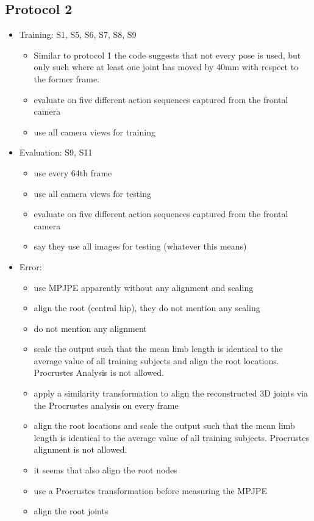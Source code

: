 \subsection{Protocol 2}
	\begin{itemize}
		\item Training: S1, S5, S6, S7, S8, S9
		\begin{itemize}
			\item Similar to protocol 1 the code suggests that not every pose is used, but only such where at least one joint has moved by 40mm with respect to the former frame.
			\item \cite{bogo16} evaluate on five different action sequences captured from the frontal camera
			\item \cite{tekin16, tekin17} use all camera views for training
		\end{itemize}
		\item Evaluation: S9, S11 
		\begin{itemize}
			\item \cite{sun17} use every 64th frame
			\item \cite{tekin16, tekin17} use all camera views for testing
			\item \cite{bogo16} evaluate on five different action sequences captured from the frontal camera
			\item \cite{moreno-noguer16} say they use all images for testing (whatever this means) 
		\end{itemize}
		\item Error: \begin{itemize}
			\item \cite{sun17} use MPJPE apparently without any alignment and scaling
			\item \cite{martinez17} align the root (central hip), they do not mention any scaling
			\item \cite{tome17} do not mention any alignment
			\item \cite{zhou18} scale the output such that the mean limb length is identical to the average value of all training subjects and align the root locations. Procrustes Analysis is not allowed.
			\item \cite{bogo16} apply a similarity transformation to align the reconstructed 3D joints via the Procrustes analysis on every frame
			\item \cite{zhou16} align the root locations and scale the output such that the mean limb length is identical to the average value of all training subjects. Procrustes alignment is not allowed.
			\item it seems that \cite{tekin16} also align the root nodes
			\item \cite{tekin17} use a Procrustes transformation before measuring the MPJPE
			\item \cite{pavlakos17} align the root joints
		\end{itemize}
	\end{itemize}

